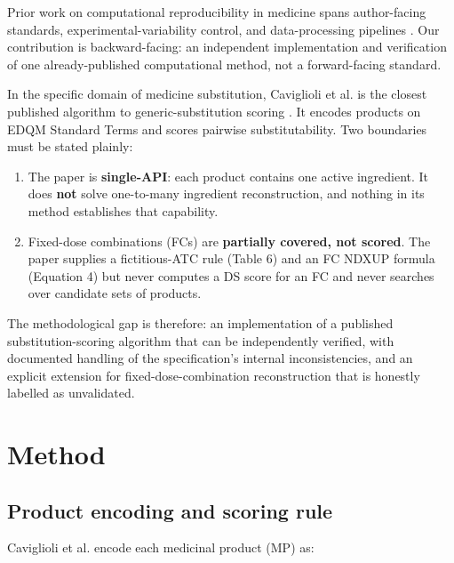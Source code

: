 \documentclass[12pt]{article}
\begin{document}
Prior work on computational reproducibility in medicine spans author-facing standards, experimental-variability control, and data-processing pipelines \citep{heil2021reproducibility,anderson2013ethical,zhao2020quantify,wagner2022fairly,sandve2013ten}. Our contribution is backward-facing: an independent implementation and verification of one already-published computational method, not a forward-facing standard.

In the specific domain of medicine substitution, Caviglioli et al.\citep{caviglioli2025medicine} is the closest published algorithm to generic-substitution scoring \citep{caviglioli2025medicine}. It encodes products on EDQM Standard Terms and scores pairwise substitutability. Two boundaries must be stated plainly:

\begin{enumerate}
\item The paper is \textbf{single-API}: each product contains one active ingredient. It does \textbf{not} solve one-to-many ingredient reconstruction, and nothing in its method establishes that capability.
\item Fixed-dose combinations (FCs) are \textbf{partially covered, not scored}. The paper supplies a fictitious-ATC rule (Table 6) and an FC NDXUP formula (Equation 4) but never computes a DS score for an FC and never searches over candidate sets of products.
\end{enumerate}

The methodological gap is therefore: an implementation of a published substitution-scoring algorithm that can be independently verified, with documented handling of the specification's internal inconsistencies, and an explicit extension for fixed-dose-combination reconstruction that is honestly labelled as unvalidated.

\section{Method}
\label{sec:method}

\subsection{Product encoding and scoring rule}

Caviglioli et al.\citep{caviglioli2025medicine} encode each medicinal product (MP) as:
\end{document}
